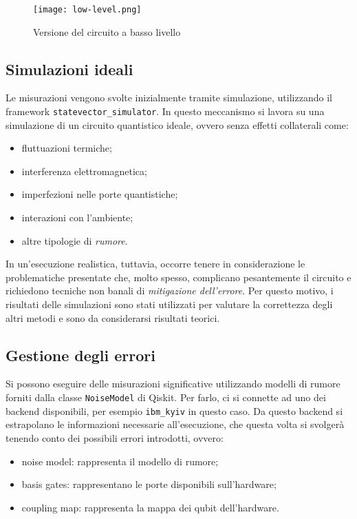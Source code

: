 \begin{figure}[ht]
    \texttt{[image: low-level.png]}
    \caption{Versione del circuito a basso livello}
\end{figure}

\subsection{Simulazioni ideali}
Le misurazioni vengono svolte inizialmente tramite simulazione, utilizzando 
il framework \texttt{statevector\_simulator}. In questo meccanismo si lavora su 
una simulazione di un circuito quantistico ideale, ovvero senza effetti collaterali come:
\begin{itemize}
    \item fluttuazioni termiche;
    \item interferenza elettromagnetica;
    \item imperfezioni nelle porte quantistiche;
    \item interazioni con l'ambiente;
    \item altre tipologie di \textit{rumore}.
\end{itemize}
In un'esecuzione realistica, tuttavia, occorre tenere in considerazione
le problematiche presentate che, molto spesso, complicano pesantemente
il circuito e richiedono tecniche non banali di \textit{mitigazione dell'errore}.
Per questo motivo, i risultati delle simulazioni sono stati utilizzati per 
valutare la correttezza degli altri metodi e sono da considerarsi risultati teorici.

\subsection{Gestione degli errori}
Si possono eseguire delle misurazioni significative utilizzando modelli 
di rumore forniti dalla classe \texttt{NoiseModel} di Qiskit. 
Per farlo, ci si connette ad uno dei backend disponibili, per esempio 
\texttt{ibm\_kyiv} in questo caso. Da questo backend si estrapolano le 
informazioni necessarie all'esecuzione, che questa volta si svolgerà
tenendo conto dei possibili errori introdotti, ovvero:
\begin{itemize}
    \item noise model: rappresenta il modello di rumore;
    \item basis gates: rappresentano le porte disponibili sull'hardware;
    \item coupling map: rappresenta la mappa dei qubit dell'hardware.
\end{itemize}

